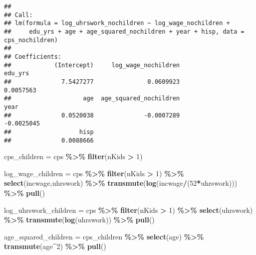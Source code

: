 \documentclass[
]{article}
\newenvironment{Shaded}{\begin{snugshade}}{\end{snugshade}}
\newcommand{\DecValTok}[1]{\textcolor[rgb]{0.00,0.00,0.81}{#1}}
\newcommand{\KeywordTok}[1]{\textcolor[rgb]{0.13,0.29,0.53}{\textbf{#1}}}
\newcommand{\NormalTok}[1]{#1}
\newcommand{\OperatorTok}[1]{\textcolor[rgb]{0.81,0.36,0.00}{\textbf{#1}}}
\newcommand{\StringTok}[1]{\textcolor[rgb]{0.31,0.60,0.02}{#1}}
\begin{document}
\begin{verbatim}
## 
## Call:
## lm(formula = log_uhrswork_nochildren ~ log_wage_nochildren + 
##     edu_yrs + age + age_squared_nochildren + year + hisp, data = cps_nochildren)
## 
## Coefficients:
##            (Intercept)     log_wage_nochildren                 edu_yrs  
##              7.5427277               0.0609923               0.0057563  
##                    age  age_squared_nochildren                    year  
##              0.0520038              -0.0007289              -0.0025045  
##                   hisp  
##              0.0088666
\end{verbatim}

\hfill\break

\begin{Shaded}
\begin{Highlighting}[]
\NormalTok{cps\_children =}\StringTok{ }\NormalTok{cps }\OperatorTok{\%\textgreater{}\%}
\StringTok{  }\KeywordTok{filter}\NormalTok{(nKids }\OperatorTok{\textgreater{}}\StringTok{ }\DecValTok{1}\NormalTok{)}

\NormalTok{log\_wage\_children =}\StringTok{ }\NormalTok{cps }\OperatorTok{\%\textgreater{}\%}
\StringTok{  }\KeywordTok{filter}\NormalTok{(nKids }\OperatorTok{\textgreater{}}\StringTok{ }\DecValTok{1}\NormalTok{) }\OperatorTok{\%\textgreater{}\%}
\StringTok{  }\KeywordTok{select}\NormalTok{(incwage,uhrswork) }\OperatorTok{\%\textgreater{}\%}
\StringTok{  }\KeywordTok{transmute}\NormalTok{(}\KeywordTok{log}\NormalTok{(incwage}\OperatorTok{/}\NormalTok{(}\DecValTok{52}\OperatorTok{*}\NormalTok{uhrswork))) }\OperatorTok{\%\textgreater{}\%}
\StringTok{  }\KeywordTok{pull}\NormalTok{()}


\NormalTok{log\_uhrswork\_children =}\StringTok{ }\NormalTok{cps }\OperatorTok{\%\textgreater{}\%}
\StringTok{  }\KeywordTok{filter}\NormalTok{(nKids }\OperatorTok{\textgreater{}}\StringTok{ }\DecValTok{1}\NormalTok{) }\OperatorTok{\%\textgreater{}\%}
\StringTok{  }\KeywordTok{select}\NormalTok{(uhrswork) }\OperatorTok{\%\textgreater{}\%}
\StringTok{  }\KeywordTok{transmute}\NormalTok{(}\KeywordTok{log}\NormalTok{(uhrswork)) }\OperatorTok{\%\textgreater{}\%}
\StringTok{  }\KeywordTok{pull}\NormalTok{()}

\NormalTok{age\_squared\_children =}\StringTok{ }\NormalTok{cps\_children }\OperatorTok{\%\textgreater{}\%}
\StringTok{  }\KeywordTok{select}\NormalTok{(age) }\OperatorTok{\%\textgreater{}\%}
\StringTok{  }\KeywordTok{transmute}\NormalTok{(age}\OperatorTok{\^{}}\DecValTok{2}\NormalTok{) }\OperatorTok{\%\textgreater{}\%}
\StringTok{  }\KeywordTok{pull}\NormalTok{()}
\end{Highlighting}
\end{Shaded}
\end{document}
